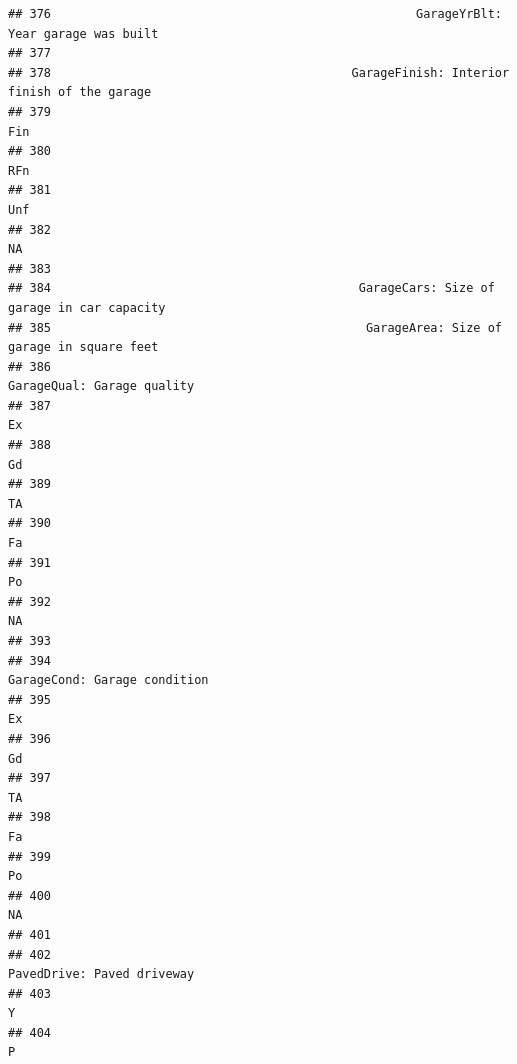 \documentclass[
]{article}
\begin{document}
\begin{verbatim}
## 376                                                   GarageYrBlt: Year garage was built
## 377                                                                                     
## 378                                          GarageFinish: Interior finish of the garage
## 379                                                                                  Fin
## 380                                                                                  RFn
## 381                                                                                  Unf
## 382                                                                                   NA
## 383                                                                                     
## 384                                           GarageCars: Size of garage in car capacity
## 385                                            GarageArea: Size of garage in square feet
## 386                                                           GarageQual: Garage quality
## 387                                                                                   Ex
## 388                                                                                   Gd
## 389                                                                                   TA
## 390                                                                                   Fa
## 391                                                                                   Po
## 392                                                                                   NA
## 393                                                                                     
## 394                                                         GarageCond: Garage condition
## 395                                                                                   Ex
## 396                                                                                   Gd
## 397                                                                                   TA
## 398                                                                                   Fa
## 399                                                                                   Po
## 400                                                                                   NA
## 401                                                                                     
## 402                                                           PavedDrive: Paved driveway
## 403                                                                                    Y
## 404                                                                                    P

\end{verbatim}
\end{document}
